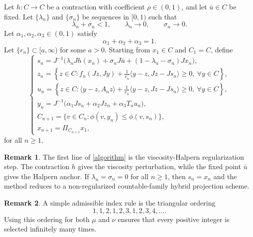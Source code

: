 \documentclass[leqno,12pt]{amsart}
\theoremstyle{definition}
\newtheorem{remark}{Remark}
\numberwithin{equation}{section}
\begin{document}
Let $h:C\to C$ be a contraction with coefficient $\rho\in(0,1)$, and let $\bar u\in C$ be fixed. Let $\{\lambda_n\}$ and $\{\sigma_n\}$ be sequences in $[0,1)$ such that
\begin{equation}\label{lambdacond}
\lambda_n+\sigma_n<1,
\qquad \lambda_n\to 0,
\qquad \sigma_n\to 0.
\end{equation}
Let $\alpha_1,\alpha_2,\alpha_3\in(0,1)$ satisfy
\begin{equation}\label{alphacond}
\alpha_1+\alpha_2+\alpha_3=1.
\end{equation}
Let $\{r_n\}\subset [a,\infty)$ for some $a>0$. Starting from $x_1\in C$ and $C_1=C$, define
\begin{equation}\label{algorithm}
\left\{
\begin{array}{ll}
s_n=J^{-1}\big(\lambda_nJh(x_n)+\sigma_nJ\bar u+(1-\lambda_n-\sigma_n)Jx_n\big),\\[2mm]
z_n=\left\{z\in C:f_n(Jz,Jy)+\frac{1}{r_n}\langle y-z,Jz-Js_n\rangle\geq 0,\ \forall y\in C\right\},\\[2mm]
u_n=\left\{z\in C:\langle y-z,A_nz\rangle+\frac{1}{r_n}\langle y-z,Jz-Js_n\rangle\geq 0,\ \forall y\in C\right\},\\[2mm]
y_n=J^{-1}\big(\alpha_1Js_n+\alpha_2Jz_n+\alpha_3T_nu_n\big),\\[2mm]
C_{n+1}=\{v\in C_n:\phi(v,y_n)\leq \phi(v,s_n)\},\\[2mm]
x_{n+1}=\Pi_{C_{n+1}}x_1,
\end{array}
\right.
\end{equation}
for all $n\geq 1$.

\begin{remark}
The first line of \eqref{algorithm} is the viscosity-Halpern regularization step. The contraction $h$ gives the viscosity perturbation, while the fixed point $\bar u$ gives the Halpern anchor. If $\lambda_n=\sigma_n=0$ for all $n\geq 1$, then $s_n=x_n$ and the method reduces to a non-regularized countable-family hybrid projection scheme.
\end{remark}

\begin{remark}
A simple admissible index rule is the triangular ordering
\[
1,1,2,1,2,3,1,2,3,4,\ldots.
\]
Using this ordering for both $\mu$ and $\nu$ ensures that every positive integer is selected infinitely many times.
\end{remark}
\end{document}
